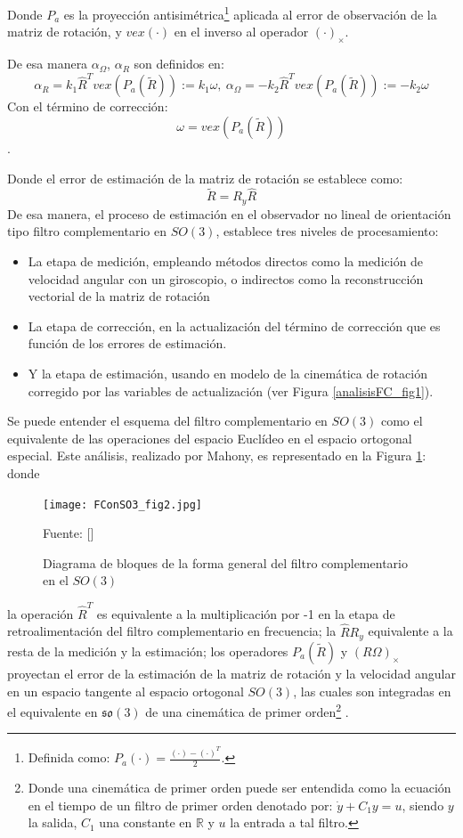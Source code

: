 \documentclass[10pt]{report}
\numberwithin{equation}{chapter}
\numberwithin{algorithm}{chapter}
\newcommand{\bcite}[1]{[\cite{#1}]}
\newcommand{\lucia}{vex(P_a(\tilde{R}))}
\begin{document}
Donde $P_a$ es la proyección antisimétrica\footnote{Definida como: $P_a(\cdot) =\frac{(\cdot)-(\cdot)^T}{2}$.} aplicada al error de observación de la matriz de rotación, y $vex(\cdot)$ en el inverso al operador $(\cdot)_\times$.\par
De esa manera $\alpha_\Omega$, $\alpha_R$ son definidos en:
\begin{equation}\label{obs_ecc2}
\alpha_R=k_1\hat{R}^Tvex(P_a(\tilde{R})):=k_1\omega, ~ \alpha_\Omega=-k_2\hat{R}^Tvex(P_a(\tilde{R})):=-k_2\omega
\end{equation}
Con el término de corrección:
\begin{equation}
\omega=\lucia
\end{equation}.\par
Donde el error de estimación de la matriz de rotación se establece como:
\begin{equation}
\tilde{R}=R_y\hat{R}
\end{equation}
De esa manera, el proceso de estimación en el observador no lineal de orientación tipo filtro complementario en $SO(3)$, establece tres niveles de procesamiento:
\begin{itemize}
\item La etapa de medición, empleando métodos directos como la medición de velocidad angular con un giroscopio, o indirectos como la reconstrucción vectorial de la matriz de rotación
\item La etapa de corrección, en la actualización del término de corrección que es función de los errores de estimación.
\item Y la etapa de estimación, usando en modelo de la cinemática de rotación corregido por las variables de actualización (ver Figura \ref{analisisFC_fig1}).
\end{itemize}
Se puede entender el esquema del filtro complementario en $SO(3)$ como el equivalente de las operaciones del espacio Euclídeo en el espacio ortogonal especial. Este análisis, realizado por Mahony, es representado en la Figura \ref{FConSO3_fig2}: donde
\begin{figure}[t]
\center
\texttt{[image: FConSO3\_fig2.jpg]}
\caption{Diagrama de bloques de la forma general del filtro complementario en el $SO(3)$}
\scriptsize{Fuente: \bcite{Mahony2008}}
\label{FConSO3_fig2}
\end{figure}
la operación $\hat{R}^T$ es equivalente a la multiplicación por -1 en la etapa de retroalimentación del filtro complementario en frecuencia; la $\hat{R}R_y$ equivalente a la resta de la medición y la estimación; los operadores $P_a(\tilde{R})$ y $(R\Omega)_\times$ proyectan el error de la estimación de la matriz de rotación y la velocidad angular en un espacio tangente al espacio ortogonal $SO(3)$, las cuales son integradas en el equivalente en $\mathfrak{so}(3)$ de una cinemática de primer orden\footnote{Donde una cinemática de primer orden puede ser entendida como la ecuación en el tiempo de un filtro de primer orden denotado por: $\dot{y}+C_1y=u$, siendo $y$ la salida, $C_1$ una constante en $\mathbb{R}$ y $u$ la entrada a tal filtro.} . \par
\end{document}
